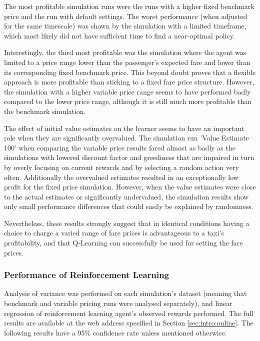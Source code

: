 The most profitable simulation runs were the runs with a higher fixed benchmark
price and the run with default settings. The worst performance (when adjusted
for the same timescale) was shown by the simulation with a limited timeframe,
which most likely did not have sufficient time to find a near-optimal policy.

Interestingly, the third most profitable was the simulation where the agent was
limited to a price range lower than the passenger's expected fare and lower
than its corresponding fixed benchmark price. This beyond doubt proves that a
flexible approach is more profitable than sticking to a fixed fare price
structure. However, the simulation with a higher variable price range seems to
have performed badly compared to the lower price range, although it is still
much more profitable than the benchmark simulation.

The effect of initial value estimates on the learner seems to have an important
role when they are significantly overvalued. The simulation run 'Value Estimate
100' when comparing the variable price results fared almost as badly as the
simulations with lowered discount factor and greediness that are impaired in
turn by overly focusing on current rewards and by selecting a random action
very often. Additionally the overvalued estimates resulted in an exceptionally
low profit for the fixed price simulation. However, when the value estimates
were close to the actual estimates or significantly undervalued, the simulation
results show only small performance differences that could easily be explained
by randomness.

Nevertheless, these results strongly suggest that in identical conditions
having a choice to charge a varied range of fare prices is advantageous to a
taxi's profitability, and that Q-Learning can successfully be used for setting
the fare prices.


\subsubsection{Performance of Reinforcement Learning}
\label{sec:results:ai}

Analysis of variance was performed on each simulation's dataset (meaning that
benchmark and variable pricing runs were analysed separately), and linear
regression of reinforcement learning agent's observed rewards performed. The
full results are available at the web address specified in Section
\ref{sec:intro:online}. The following results have a 95\% confidence rate
unless mentioned otherwise.

